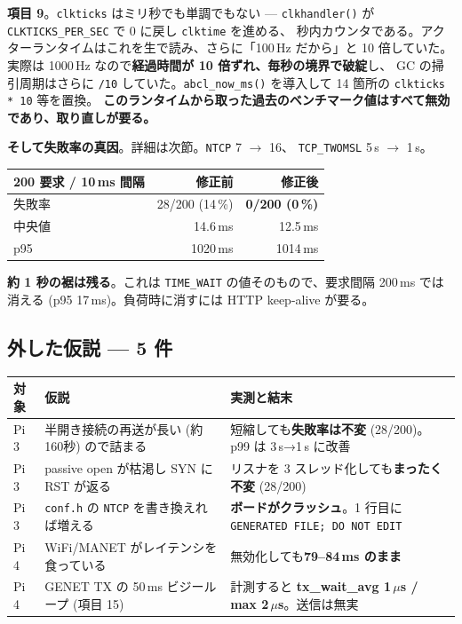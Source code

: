 \documentclass[a4paper,11pt]{ltjsarticle}
\begin{document}
\textbf{項目 9}。\texttt{clkticks} はミリ秒でも単調でもない ---
\texttt{clkhandler()} が \texttt{CLKTICKS\_PER\_SEC} で 0 に戻し \texttt{clktime} を進める、
秒内カウンタである。アクターランタイムはこれを生で読み、さらに「100\,Hz だから」と
10 倍していた。実際は 1000\,Hz なので\textbf{経過時間が 10 倍ずれ、毎秒の境界で破綻}し、
GC の掃引周期はさらに \texttt{/10} していた。\texttt{abcl\_now\_ms()} を導入して
14 箇所の \texttt{clkticks * 10} 等を置換。
\textbf{このランタイムから取った過去のベンチマーク値はすべて無効であり、取り直しが要る。}

\textbf{そして失敗率の真因}。詳細は次節。\texttt{NTCP} 7 $\rightarrow$ 16、
\texttt{TCP\_TWOMSL} 5\,s $\rightarrow$ 1\,s。

\begin{center}
\begin{tabular}{@{}l r r@{}}
\toprule
\textbf{200 要求 / 10\,ms 間隔} & \textbf{修正前} & \textbf{修正後}\\
\midrule
失敗率 & 28/200 (14\,\%) & \textbf{0/200 (0\,\%)}\\
中央値 & 14.6\,ms & 12.5\,ms\\
p95    & 1020\,ms & 1014\,ms\\
\bottomrule
\end{tabular}
\end{center}

\textbf{約 1 秒の裾は残る}。これは \texttt{TIME\_WAIT} の値そのもので、要求間隔 200\,ms では
消える (p95 17\,ms)。負荷時に消すには HTTP keep-alive が要る。

\subsection{外した仮説 --- 5 件}

\begin{center}\small
\begin{longtable}{@{}l p{5.4cm} p{5.6cm}@{}}
\toprule
\textbf{対象} & \textbf{仮説} & \textbf{実測と結末}\\ \midrule
\endhead
Pi 3 & 半開き接続の再送が長い (約160秒) ので詰まる &
  短縮しても\textbf{失敗率は不変} (28/200)。p99 は 3\,s→1\,s に改善\\
Pi 3 & passive open が枯渇し SYN に RST が返る &
  リスナを 3 スレッド化しても\textbf{まったく不変} (28/200)\\
Pi 3 & \texttt{conf.h} の \texttt{NTCP} を書き換えれば増える &
  \textbf{ボードがクラッシュ}。1 行目に \texttt{GENERATED FILE; DO NOT EDIT}\\
Pi 4 & WiFi/MANET がレイテンシを食っている &
  無効化しても\textbf{79--84\,ms のまま}\\
Pi 4 & GENET TX の 50\,ms ビジーループ (項目 15) &
  計測すると \textbf{tx\_wait\_avg 1\,$\mu$s / max 2\,$\mu$s}。送信は無実\\
\bottomrule
\end{longtable}
\end{center}
\end{document}

